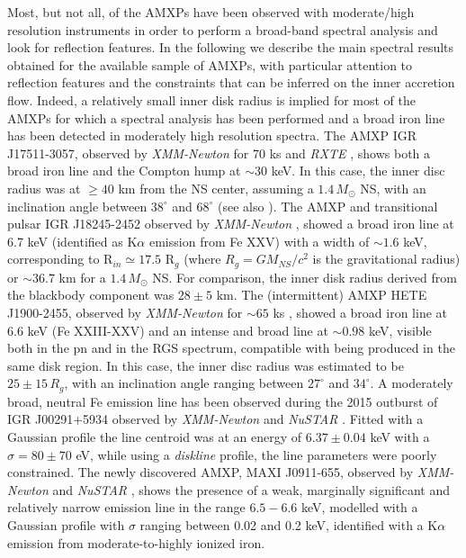 \documentclass[graybox]{svmult}
\def \xmm {{\em XMM-Newton\xspace}}
\def \rxte {{\em RXTE\xspace}}
\def \nustar{{\em NuSTAR\xspace}}
\begin{document}
Most, but not all, of the AMXPs have been observed with moderate/high resolution instruments in order to perform a broad-band spectral analysis and look for reflection features. In the following we describe the main spectral results obtained for the available sample of AMXPs, with particular attention to reflection features and the constraints that can be inferred on the inner accretion flow. 
Indeed, a relatively small inner disk radius is implied for most of the AMXPs for which a spectral analysis has been performed and a broad iron line has been detected in moderately high resolution spectra. 
The AMXP IGR J17511-3057, observed by \xmm{} for 70 ks and \rxte{} \cite{Papitto2010}, shows both a broad iron line and the Compton hump at $\sim 30$ keV. In this case, the inner disc radius was at $\ge 40$ km from the NS center, assuming a $1.4\, M_\odot$ NS, with an inclination angle between $38^\circ$ and $68^\circ$ (see also \cite{Papitto2016}). 
The AMXP and transitional pulsar IGR J18245-2452 observed by \xmm{} \cite{Papitto2013b}, showed a broad iron line at 6.7 keV (identified as K$\alpha$ emission from Fe XXV) with a width of $\sim 1.6$ keV, corresponding to R$_{in} \simeq 17.5$ R$_g$ (where $R_g = G M_{NS}/c^2$ is the gravitational radius) or $\sim 36.7$ km for a $1.4\, M_\odot$ NS. For comparison, the inner disk radius derived from the blackbody component was $28 \pm 5$ km. The (intermittent) AMXP HETE J1900-2455, observed by \xmm{} for $\sim 65$ ks \cite{Papitto2013a}, showed a broad iron line at 6.6 keV (Fe XXIII-XXV) and an intense and broad line at $\sim 0.98$ keV, visible both in the pn and in the RGS spectrum, compatible with being produced in the same disk region. In this case, the inner disc radius was estimated to be $25 \pm 15\, R_g$, with an inclination angle ranging between $27^\circ$ and $34^\circ$.
A moderately broad, neutral Fe emission line has been observed during the 2015 outburst of IGR J00291+5934 observed by \xmm{} and \nustar{} \cite{Sanna2017d}. Fitted with a Gaussian profile the line centroid was at an energy of $6.37 \pm 0.04$ keV with a $\sigma = 80 \pm 70$ eV, while using a {\it diskline} profile, the line parameters were poorly constrained. The newly discovered AMXP, MAXI J0911-655, observed by \xmm{} and \nustar{} \cite{Sanna2017d}, shows the presence of a weak, marginally significant and relatively narrow emission line in the range $6.5-6.6$ keV, modelled with a Gaussian profile with $\sigma$ ranging between 0.02 and 0.2 keV, identified with a K$\alpha$ emission from moderate-to-highly ionized iron.
\end{document}
